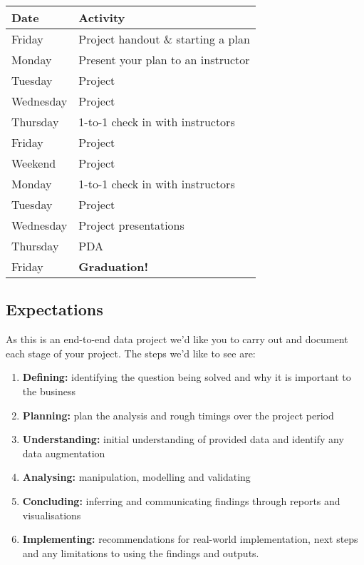 \documentclass[
]{article}
\providecommand{\tightlist}{%
  \setlength{\itemsep}{0pt}\setlength{\parskip}{0pt}}
\begin{document}
\begin{longtable}[]{@{}ll@{}}
\toprule
Date & Activity \\
\midrule
\endhead
Friday & Project handout \& starting a plan \\
Monday & Present your plan to an instructor \\
Tuesday & Project \\
Wednesday & Project \\
Thursday & 1-to-1 check in with instructors \\
Friday & Project \\
Weekend & Project \\
Monday & 1-to-1 check in with instructors \\
Tuesday & Project \\
Wednesday & Project presentations \\
Thursday & PDA \\
Friday & \textbf{Graduation!} 🎂🥂🎈🎉🎊 \\
\bottomrule
\end{longtable}

\hypertarget{expectations}{%
\subsection{Expectations}\label{expectations}}

As this is an end-to-end data project we'd like you to carry out and
document each stage of your project. The steps we'd like to see are:

\begin{enumerate}
\def\labelenumi{\arabic{enumi}.}
\tightlist
\item
  \textbf{Defining:} identifying the question being solved and why it is
  important to the business
\item
  \textbf{Planning:} plan the analysis and rough timings over the
  project period
\item
  \textbf{Understanding:} initial understanding of provided data and
  identify any data augmentation
\item
  \textbf{Analysing:} manipulation, modelling and validating
\item
  \textbf{Concluding:} inferring and communicating findings through
  reports and visualisations
\item
  \textbf{Implementing:} recommendations for real-world implementation,
  next steps and any limitations to using the findings and outputs.
\end{enumerate}
\end{document}
